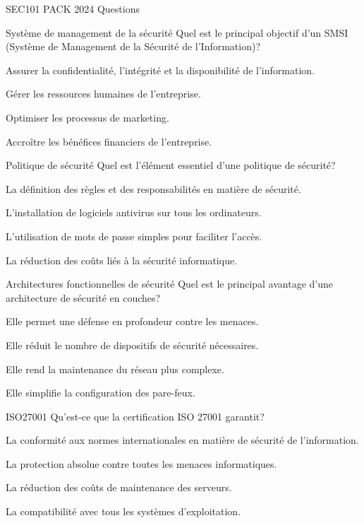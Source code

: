 \documentclass[12pt]{article}
\begin{document}
\begin{quiz}{SEC101 PACK 2024 Questions}
\begin{multi}[points=1]{Système de management de la sécurité}
Quel est le principal objectif d'un SMSI (Système de Management de la Sécurité de l'Information)?
\item* Assurer la confidentialité, l'intégrité et la disponibilité de l'information.
\item Gérer les ressources humaines de l'entreprise.
\item Optimiser les processus de marketing.
\item Accroître les bénéfices financiers de l'entreprise.
\end{multi}

\begin{multi}[points=1]{Politique de sécurité}
Quel est l'élément essentiel d'une politique de sécurité?
\item* La définition des règles et des responsabilités en matière de sécurité.
\item L'installation de logiciels antivirus sur tous les ordinateurs.
\item L'utilisation de mots de passe simples pour faciliter l'accès.
\item La réduction des coûts liés à la sécurité informatique.
\end{multi}

\begin{multi}[points=1]{Architectures fonctionnelles de sécurité}
Quel est le principal avantage d'une architecture de sécurité en couches?
\item* Elle permet une défense en profondeur contre les menaces.
\item Elle réduit le nombre de dispositifs de sécurité nécessaires.
\item Elle rend la maintenance du réseau plus complexe.
\item Elle simplifie la configuration des pare-feux.
\end{multi}

\begin{multi}[points=1]{ISO27001}
Qu'est-ce que la certification ISO 27001 garantit?
\item* La conformité aux normes internationales en matière de sécurité de l'information.
\item La protection absolue contre toutes les menaces informatiques.
\item La réduction des coûts de maintenance des serveurs.
\item La compatibilité avec tous les systèmes d'exploitation.
\end{multi}


\end{quiz}
\end{document}
